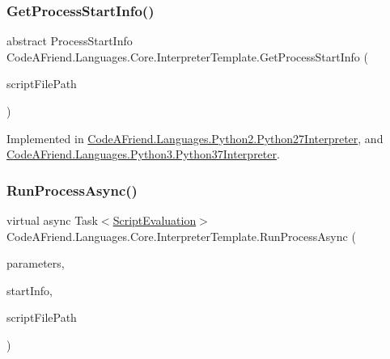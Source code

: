 \subsubsection{\texorpdfstring{Get\+Process\+Start\+Info()}{GetProcessStartInfo()}}
{\footnotesize\ttfamily abstract Process\+Start\+Info Code\+A\+Friend.\+Languages.\+Core.\+Interpreter\+Template.\+Get\+Process\+Start\+Info (\begin{DoxyParamCaption}\item[{string}]{script\+File\+Path }\end{DoxyParamCaption})\hspace{0.3cm}{\ttfamily [pure virtual]}}



Implemented in \mbox{\hyperlink{class_code_a_friend_1_1_languages_1_1_python2_1_1_python27_interpreter_a24b4f1f296ab282b0fcac3951af0a73b}{Code\+A\+Friend.\+Languages.\+Python2.\+Python27\+Interpreter}}, and \mbox{\hyperlink{class_code_a_friend_1_1_languages_1_1_python3_1_1_python37_interpreter_a61f777c41849f97cd94eccee5fe7c617}{Code\+A\+Friend.\+Languages.\+Python3.\+Python37\+Interpreter}}.

\mbox{\label{class_code_a_friend_1_1_languages_1_1_core_1_1_interpreter_template_aa76d5e57b00dfa82862362288d140e1b}} 
\subsubsection{\texorpdfstring{Run\+Process\+Async()}{RunProcessAsync()}}
{\footnotesize\ttfamily virtual async Task$<$\mbox{\hyperlink{class_code_a_friend_1_1_data_model_1_1_script_evaluation}{Script\+Evaluation}}$>$ Code\+A\+Friend.\+Languages.\+Core.\+Interpreter\+Template.\+Run\+Process\+Async (\begin{DoxyParamCaption}\item[{\mbox{\hyperlink{class_code_a_friend_1_1_data_model_1_1_execution_parameters}{Execution\+Parameters}}}]{parameters,  }\item[{Process\+Start\+Info}]{start\+Info,  }\item[{string}]{script\+File\+Path }\end{DoxyParamCaption})\hspace{0.3cm}{\ttfamily [virtual]}}

